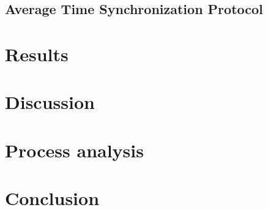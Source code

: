\documentclass[a4paper,12pt]{article}
\begin{document}


\subsection{Average Time Synchronization Protocol}



\section{Results}


\section{Discussion}

\section{Process analysis}%

\section{Conclusion}



\nocite{*} %
\printbibliography
\end{document}
